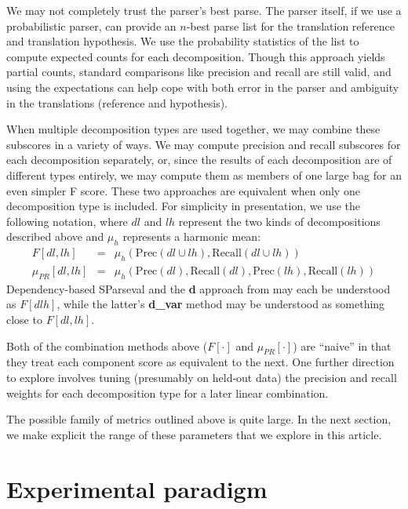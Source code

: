 \documentclass{kluwer}    %
\newcommand{\precision}[1]{\ensuremath{\textrm{Prec}\left(#1\right)}}
\newcommand{\recall}[1]{\ensuremath{\textrm{Recall}\left(#1\right)}}
\begin{document}
\begin{article}
We may not completely trust the parser's best parse.  The parser
itself, if we use a probabilistic parser, can provide an $n$-best
parse list for the translation reference and translation
hypothesis. We use the probability statistics of the list to compute
expected counts for each decomposition. Though this approach yields
partial counts, standard comparisons like precision and recall are
still valid, and using the expectations can help cope with both error
in the parser and ambiguity in the translations (reference and
hypothesis).

When multiple decomposition types are used together, we may combine
these subscores in a variety of ways.  We may compute precision and
recall subscores for each decomposition separately, or, since the
results of each decomposition are of different types entirely, we may
compute them as members of one large bag for an even simpler F score.
These two approaches are equivalent when only one decomposition type
is included.  For simplicity in presentation, we use the following
notation, where $dl$ and $lh$ represent the two kinds of
decompositions described above and $\mu_h$ represents a harmonic mean:
\begin{eqnarray}
  \label{eq:fprmeans}
  F[dl,lh] & = &
  \mu_h \left( \precision{dl \cup lh},
    \recall{dl \cup lh} \right) \\
  \mu_{PR}[dl,lh]  & = & \mu_h \left( \precision{dl},
    \recall{dl}, \precision{lh}, \recall{lh} \right)    
\end{eqnarray}
Dependency-based SParseval and the \textbf{d} approach from
 may each be understood as
$F[dlh]$, while the latter's \textbf{d\_var} method may be understood
as something close to $F[dl,lh]$.

Both of the combination methods above ($F[\cdot]$ and
$\mu_{PR}[\cdot]$) are ``naive'' in that they treat each component
score as equivalent to the next.  One further direction to explore
involves tuning (presumably on held-out data) the precision and recall
weights for each decomposition type for a later linear combination.

The possible family of metrics outlined above is quite large. In the
next section, we make explicit the range of these parameters that we
explore in this article.


\section{Experimental paradigm}
\label{sec:paradigm}


\end{article}
\end{document}

